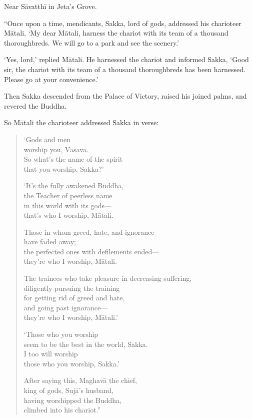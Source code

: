 \documentclass[12pt,openany]{book}%
\begin{document}
Near \textsanskrit{Sāvatthī} in Jeta’s Grove. 

“Once upon a time, mendicants, Sakka, lord of gods, addressed his charioteer \textsanskrit{Mātali}, ‘My dear \textsanskrit{Mātali}, harness the chariot with its team of a thousand thoroughbreds. We will go to a park and see the scenery.’ 

‘Yes, lord,’ replied \textsanskrit{Mātali}. He harnessed the chariot and informed Sakka, ‘Good sir, the chariot with its team of a thousand thoroughbreds has been harnessed. Please go at your convenience.’ 

Then Sakka descended from the Palace of Victory, raised his joined palms, and revered the Buddha. 

So \textsanskrit{Mātali} the charioteer addressed Sakka in verse: 

\begin{verse}%
‘Gods and men \\
worship you, \textsanskrit{Vāsava}. \\
So what’s the name of the spirit \\
that you worship, Sakka?’ 

‘It’s the fully awakened Buddha, \\
the Teacher of peerless name \\
in this world with its gods—\\
that’s who I worship, \textsanskrit{Mātali}. 

Those in whom greed, hate, and ignorance \\
have faded away; \\
the perfected ones with defilements ended—\\
they're who I worship, \textsanskrit{Mātali}. 

The trainees who take pleasure in decreasing suffering, \\
diligently pursuing the training \\
for getting rid of greed and hate, \\
and going past ignorance—\\
they’re who I worship, \textsanskrit{Mātali}.’ 

‘Those who you worship \\
seem to be the best in the world, Sakka. \\
I too will worship \\
those who you worship, Sakka.’ 

After saying this, \textsanskrit{Maghavā} the chief, \\
king of gods, \textsanskrit{Sujā}’s husband, \\
having worshipped the Buddha, \\
climbed into his chariot.” 

%
\end{verse}
\end{document}
